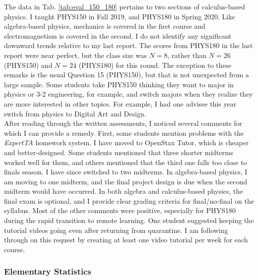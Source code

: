 \documentclass[../../main.tex]{subfiles}
\begin{document}
The data in Tab. \ref{tab:eval_150_180} pertains to two sections of calculus-based physics.  I taught PHYS150 in Fall 2019, and PHYS180 in Spring 2020.  Like algebra-based physics, mechanics is covered in the first course and electromagnetism is covered in the second.  I do not identify any significant downward trends relative to my last report.  The scores from PHYS180 in the last report were near perfect, but the class size was $N = 8$, rather than $N = 26$ (PHYS150) and $N = 24$ (PHYS180) for this round.  The exception to these remarks is the usual Question 15 (PHYS150), but that is not unexpected from a large sample.  Some students take PHYS150 thinking they want to major in physics or 3-2 engineering, for example, and switch majors when they realize they are more interested in other topics.  For example, I had one advisee this year switch from physics to Digital Art and Design.
\\
\vspace{0.15cm}
After reading through the written assessments, I noticed several comments for which I can provide a remedy.  First, some students mention problems with the \textit{ExpertTA} homework system.  I have moved to OpenStax Tutor, which is cheaper and better-designed.  Some students mentioned that three shorter midterms worked well for them, and others mentioned that the third one falls too close to finals season.  I have since switched to two midterms.  In algebra-based physics, I am moving to one midterm, and the final project design is due when the second midterm would have occurred.  In both algebra and calculus-based physics, the final exam is optional, and I provide clear grading criteria for final/no-final on the syllabus.  Most of the other comments were positive, especially for PHYS180 during the rapid transition to remote learning.  One student suggested keeping the tutorial videos going even after returning from quarantine.  I am following through on this request by creating at least one video tutorial per week for each course.

\subsubsection{Elementary Statistics}
\end{document}
